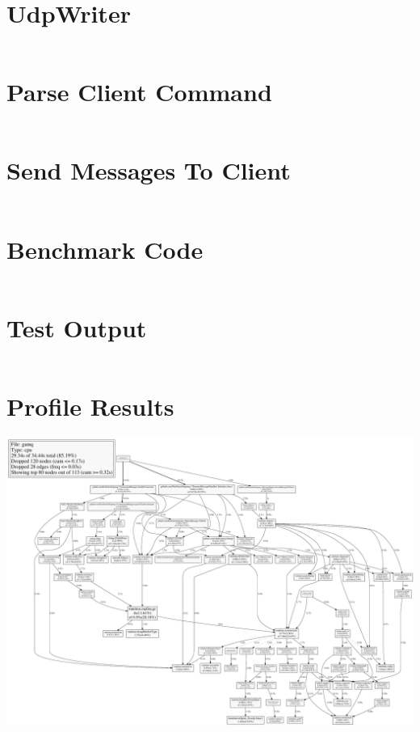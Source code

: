 \chapter{UdpWriter}
\label{appendix:udpWriter}

\inputminted[breaklines=true, breakanywhere]{go}{code/gamq/udp/udpwriter.go}

\chapter{Parse Client Command}
\label{appendix:parseClientCommand}

\inputminted[breaklines=true, breakanywhere, firstline=226, lastline=260]{go}{code/gamq/connectionmanager.go}

\chapter{Send Messages To Client}
\label{appendix:sendMessagesToClient}

\inputminted[breaklines=true, breakanywhere, firstline=35, lastline=67]{go}{code/gamq/messageshipper.go}

\chapter{Benchmark Code}
\label{appendix:benchmarkCode}

\inputminted[breaklines]{python}{code/gamq/tools/benchmark/benchmark.py}

\chapter{Test Output}
\label{appendix:testOutput}

\inputminted[breaklines]{bash}{code/goTestOutput}

\chapter{Profile Results}
\label{appendix:profileResults}

\includegraphics[width=\textwidth]{figures/profileOutput}
